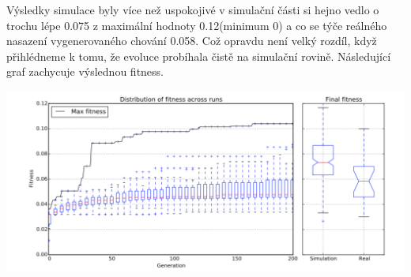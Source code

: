 \begin{table}
	\caption{Parameterizing behavior trees, Motion in Games - nastavení parametrů}
\end{table}
\par
Výsledky simulace byly více než uspokojivé v simulační části si hejno vedlo o trochu lépe 0.075 z maximální hodnoty 0.12(minimum 0) a co se týče reálného nasazení vygenerovaného chování 0.058. Což opravdu není velký rozdíl, když přihlédneme k tomu, že evoluce probíhala čistě na simulační rovině. Následující graf zachycuje výslednou fitness. 
\par
\begin{center}
\includegraphics[scale=0.8  ]{../img/kilobotsGraph.png}
\end{center}


